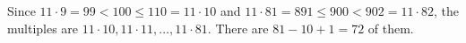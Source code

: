 Since $11\cdot9=99<100\le110=11\cdot10$ and $11\cdot81=891\le900<902=11\cdot82$, the multiples are $11\cdot10,11\cdot11,\dots,11\cdot81$. There are $81-10+1=\boxed{72}$ of them.
